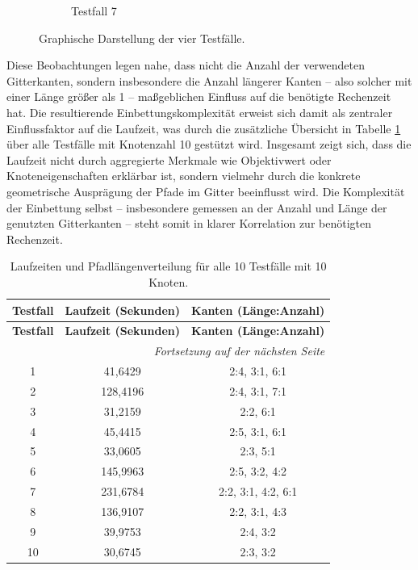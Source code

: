 \documentclass[bachelor, german]{algothesis}
\begin{document}
\begin{figure}[H]
\begin{subfigure}[b]{0.45\textwidth}
        \caption{Testfall 7}
        \label{fig:teilbild_d}
    \end{subfigure}
    \hfill
    \caption{Graphische Darstellung der vier Testfälle.}
    \label{fig:gesamtabbildung}
\end{figure}


Diese Beobachtungen legen nahe, dass nicht die Anzahl der verwendeten Gitterkanten, sondern insbesondere die Anzahl längerer Kanten – also solcher mit einer Länge größer als 1 – maßgeblichen Einfluss auf die benötigte Rechenzeit hat. Die resultierende Einbettungskomplexität erweist sich damit als zentraler Einflussfaktor auf die Laufzeit, was durch die zusätzliche Übersicht in Tabelle \ref{tab:tabpa} über alle Testfälle mit Knotenzahl 10 gestützt wird.\newline 
Insgesamt zeigt sich, dass die Laufzeit nicht durch aggregierte Merkmale wie Objektivwert oder Knoteneigenschaften erklärbar ist, sondern vielmehr durch die konkrete geometrische Ausprägung der Pfade im Gitter beeinflusst wird. Die Komplexität der Einbettung selbst – insbesondere gemessen an der Anzahl und Länge der genutzten Gitterkanten – steht somit in klarer Korrelation zur benötigten Rechenzeit.\newline 


\begin{longtable}{|c|c|c|}
\caption{Laufzeiten und Pfadlängenverteilung für alle 10 Testfälle mit 10 Knoten.} \label{tab:tabpa} \\
\hline
\textbf{Testfall} & \textbf{Laufzeit (Sekunden)} & \textbf{Kanten (Länge:Anzahl)} \\
\hline
\endfirsthead

\hline
\textbf{Testfall} & \textbf{Laufzeit (Sekunden)} & \textbf{Kanten (Länge:Anzahl)} \\
\hline
\endhead

\hline
\multicolumn{3}{|r|}{\textit{Fortsetzung auf der nächsten Seite}} \\
\hline
\endfoot

\hline
\endlastfoot

1 & 41,6429 & 2:4, 3:1, 6:1 \\
2 & 128,4196 & 2:4, 3:1, 7:1 \\
3 & 31,2159 & 2:2, 6:1 \\
4 & 45,4415 & 2:5, 3:1, 6:1 \\
5 & 33,0605 & 2:3, 5:1 \\
6 & 145,9963 & 2:5, 3:2, 4:2 \\
7 & 231,6784 & 2:2, 3:1, 4:2, 6:1 \\
8 & 136,9107 & 2:2, 3:1, 4:3 \\
9 & 39,9753 & 2:4, 3:2 \\
10 & 30,6745 & 2:3, 3:2 \\
\end{longtable}
\end{document}
